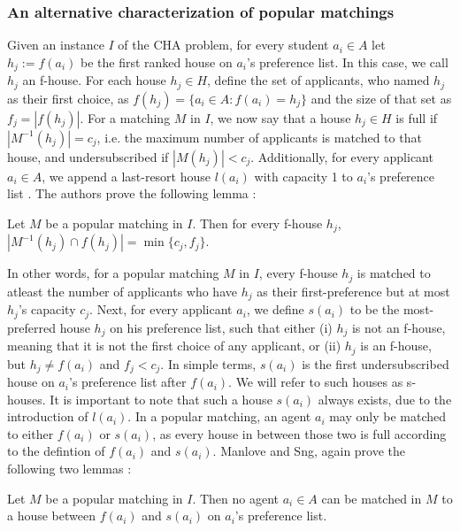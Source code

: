 \subsubsection{An alternative characterization of popular matchings}
Given an instance $I$ of the CHA problem, for every student $a_i \in A$ let $h_j := f(a_i)$ be the first ranked house on $a_i$'s preference list. In this case, we call $h_j$ an f-house. For each house $h_j \in H$, define the set of applicants, who named $h_j$ as their first choice, as $f(h_j) = \{a_i \in A: f(a_i) = h_j\}$ and the size of that set as $f_j = |f(h_j)|$. For a matching $M$ in $I$, we now say that a house $h_j \in H$ is full if $|M^{-1}(h_j)| = c_j$, i.e. the maximum number of applicants is matched to that house, and undersubscribed if $|M(h_j)| < c_j$. Additionally, for every applicant $a_i \in A$, we append a last-resort house $l(a_i)$ with capacity 1 to $a_i$'s preference list \cite{ManlovePopularMatchings}. The authors prove the following lemma \cite{ManlovePopularMatchings}:
\newtheorem{lemma-popular-1}[theorem]{Lemma}
\begin{lemma}\label{lemma-popular1}
    Let $M$ be a popular matching in $I$. Then for every f-house $h_j$, $|M^{-1}(h_j) \cap f(h_j)| = \min\{c_j, f_j\}$.
\end{lemma} 
In other words, for a popular matching $M$ in $I$, every f-house $h_j$ is matched to atleast the number of applicants who have $h_j$ as their first-preference but at most $h_j$'s capacity $c_j$. Next, for every applicant $a_i$, we define $s(a_i)$ to be the most-preferred house $h_j$ on his preference list, such that either (i) $h_j$  is not an f-house, meaning that it is not the first choice of any applicant, or (ii) $h_j$ is an f-house, but $h_j \neq f(a_i)$ and $f_j < c_j$. In simple terms, $s(a_i)$ is the first undersubscribed house on $a_i$'s preference list after $f(a_i)$. We will refer to such houses as s-houses. It is important to note that such a house $s(a_i)$ always exists, due to the introduction of $l(a_i)$. In a popular matching, an agent $a_i$ may only be matched to either $f(a_i)$ or $s(a_i)$, as every house in between those two is full according to the defintion of $f(a_i)$ and $s(a_i)$. Manlove and Sng, again prove the following two lemmas \cite{ManlovePopularMatchings}: 

\newtheorem{lemma-popular-2}[theorem]{Lemma}
\begin{lemma}\label{lemma-popular2}
    Let $M$ be a popular matching in $I$. Then no agent $a_i \in A$ can be matched in $M$ to a house between $f(a_i)$ and $s(a_i)$ on $a_i$'s preference list.
\end{lemma} 


